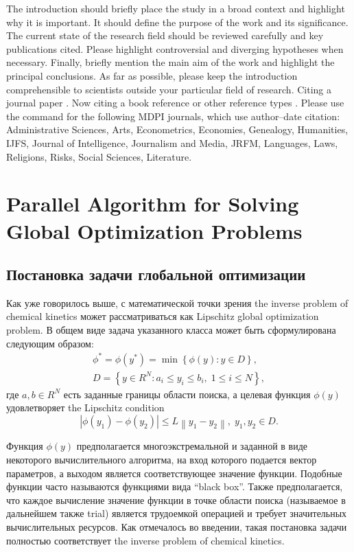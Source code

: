 \documentclass[mathematics,article,submit,pdftex,moreauthors]{Definitions/mdpi}
\begin{document}
The introduction should briefly place the study in a broad context and highlight why it is important. It should define the purpose of the work and its significance. The current state of the research field should be reviewed carefully and key publications cited. Please highlight controversial and diverging hypotheses when necessary. Finally, briefly mention the main aim of the work and highlight the principal conclusions. As far as possible, please keep the introduction comprehensible to scientists outside your particular field of research. Citing a journal paper \cite{ref-journal}. Now citing a book reference \cite{ref-book1,ref-book2} or other reference types \cite{ref-unpublish,ref-communication,ref-proceeding}. Please use the command \citep{ref-thesis,ref-url} for the following MDPI journals, which use author--date citation: Administrative Sciences, Arts, Econometrics, Economies, Genealogy, Humanities, IJFS, Journal of Intelligence, Journalism and Media, JRFM, Languages, Laws, Religions, Risks, Social Sciences, Literature.


\section{Parallel Algorithm for Solving Global Optimization Problems }\label{Sec_GSA}

\subsection{Постановка задачи глобальной оптимизации}

Как уже говорилось выше, с математической точки зрения the inverse problem of chemical kinetics может рассматриваться как Lipschitz global optimization problem. 
В общем виде задача указанного класса может быть сформулирована следующим образом:
\begin{gather}
 \phi^* = \phi(y^\ast)=\min{\left\{\phi(y):y\in D\right\}}, \label{problemN}\\
 D=\left\{y\in R^N: a_i\leq y_i \leq b_i, \;  1\leq i \leq N\right\} \label{D},
\end{gather}
где $a,b \in R^N$ есть заданные границы области поиска, а целевая функция $\phi(y)$ удовлетворяет the Lipschitz condition
\begin{equation}\label{Lip}
\left|\phi(y_1)-\phi(y_2)\right|\leq L\left\|y_1-y_2\right\|,\; y_1,y_2 \in D.
\end{equation}

Функция $\phi(y)$ предполагается многоэкстремальной и заданной в виде некоторого вычислительного алгоритма, на вход которого подается вектор параметров, а выходом является  соответствующее значение функции. Подобные функции часто называются функциями вида ``black box''. Также предполагается, что каждое вычисление значение функции в точке области поиска (называемое в дальнейшем также trial) является трудоемкой операцией и требует значительных вычислительных ресурсов. Как отмечалось во введении, такая постановка задачи полностью соответствует the inverse problem of chemical kinetics.
\end{document}
